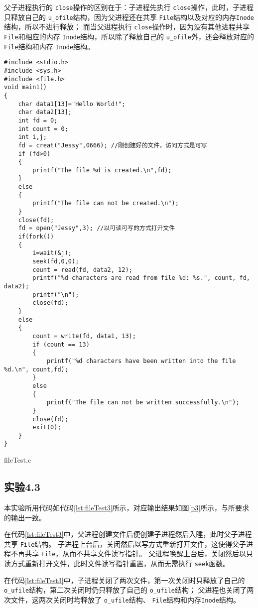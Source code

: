 父子进程执行的 \texttt{close}操作的区别在于：子进程先执行 \texttt{close}操作，此时，子进程只释放自己的 \texttt{u\_ofile}结构，因为父进程还在共享 \texttt{File}结构以及对应的内存\texttt{Inode}结构，所以不进行释放；
而当父进程执行 \texttt{close}操作时，因为没有其他进程共享 \texttt{File}和相应的内存 \texttt{Inode}结构，所以除了释放自己的 \texttt{u\_ofile}外，还会释放对应的 \texttt{File}结构和内存 \texttt{Inode}结构。

\begin{listing}[htbp]
    \begin{verbatim}
#include <stdio.h>
#include <sys.h>
#include <file.h>
void main1()
{
    char data1[13]="Hello World!";
    char data2[13];
    int fd = 0;
    int count = 0;
    int i,j;
    fd = creat("Jessy",0666); //刚创建好的文件，访问方式是可写
    if (fd>0)
    {
        printf("The file %d is created.\n",fd);
    }
    else
    {
        printf("The file can not be created.\n");
    }
    close(fd);
    fd = open("Jessy",3); //以可读可写的方式打开文件
    if(fork())
    {
        i=wait(&j);
        seek(fd,0,0);
        count = read(fd, data2, 12);
        printf("%d characters are read from file %d: %s.", count, fd, data2);
        printf("\n");
        close(fd);
    }
    else
    {
        count = write(fd, data1, 13);
        if (count == 13)
        {
            printf("%d characters have been written into the file %d.\n", count,fd);
        }
        else
        {
            printf("The file can not be written successfully.\n");
        }
        close(fd);
        exit(0);
    }
}
    \end{verbatim}
    \caption{fileTest.c}\label{lst:fileTest2}
\end{listing}

\subsection{实验4.3}

本实验所用代码如代码\ref{lst:fileTest3}所示，对应输出结果如图\ref{p3}所示，与所要求的输出一致。

在代码\ref{lst:fileTest3}中，父进程创建文件后便创建子进程然后入睡，此时父子进程共享 \texttt{File}结构。
子进程上台后，关闭然后以写方式重新打开文件，这使得父子进程不再共享 \texttt{File}，从而不共享文件读写指针。
父进程唤醒上台后，关闭然后以只读方式重新打开文件，此时文件读写指针重置，从而无需执行 \texttt{seek}函数。

在代码\ref{lst:fileTest3}中，子进程关闭了两次文件，第一次关闭时只释放了自己的 \texttt{o\_ufile}结构，第二次关闭时仍只释放了自己的 \texttt{o\_ufile}结构；
父进程也关闭了两次文件，这两次关闭时均释放了 \texttt{o\_ufile}结构、 \texttt{File}结构和内存\texttt{Inode}结构。

